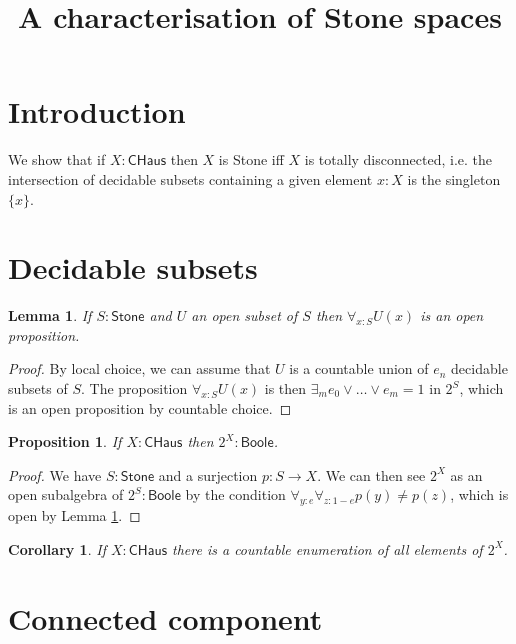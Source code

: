 \documentclass[10pt,a4paper]{article}
\newtheorem{corollary}{Corollary}[section]
\newtheorem{lemma}{Lemma}[section]
\newtheorem{proposition}{Proposition}[section]
\newcommand{\Stone}{\mathsf{Stone}}
\newcommand{\Boole}{\mathsf{Boole}}
\newcommand{\CHaus}{\mathsf{CHaus}}
\begin{document}
\title{A characterisation of Stone spaces}

\author{}
\date{}
\maketitle


\section*{Introduction}

We show that if $X:\CHaus$ then $X$ is Stone iff $X$ is totally disconnected, i.e. the intersection of
decidable subsets containing a given element $x:X$ is the singleton $\{x\}$.

\section{Decidable subsets}

\begin{lemma}\label{stcomp}
  If $S:\Stone$ and $U$ an open subset of $S$ then $\forall_{x:S}U(x)$ is an open proposition.
\end{lemma}

\begin{proof}
  By local choice, we can assume that $U$ is a countable union of $e_n$ decidable subsets of $S$.
  The proposition $\forall_{x:S}U(x)$ is then $\exists_m e_0\vee\dots\vee e_m = 1$ in $2^S$, which is
  an open proposition by countable choice.
\end{proof}


\begin{proposition}\label{chb}
  If $X:\CHaus$ then $2^X:\Boole$.
\end{proposition}

\begin{proof}
  We have $S:\Stone$ and a surjection $p:S\rightarrow X$. We can then see $2^X$ as an open subalgebra
  of $2^S:\Boole$ by the condition $\forall_{y:e}\forall_{z:1-e}p(y)\neq p(z)$, which is open by
  Lemma \ref{stcomp}.
\end{proof}

\begin{corollary}\label{count}
  If $X:\CHaus$ there is a countable enumeration of all elements of $2^X$.
\end{corollary}

\section{Connected component}
\end{document}
